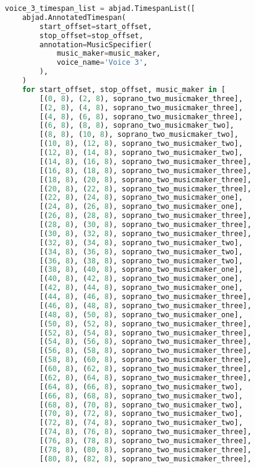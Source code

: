 \begin{lstlisting}[language=Python, caption=Invocation Source Code]
voice_3_timespan_list = abjad.TimespanList([
    abjad.AnnotatedTimespan(
        start_offset=start_offset,
        stop_offset=stop_offset,
        annotation=MusicSpecifier(
            music_maker=music_maker,
            voice_name='Voice 3',
        ),
    )
    for start_offset, stop_offset, music_maker in [
        [(0, 8), (2, 8), soprano_two_musicmaker_three],
        [(2, 8), (4, 8), soprano_two_musicmaker_three],
        [(4, 8), (6, 8), soprano_two_musicmaker_three],
        [(6, 8), (8, 8), soprano_two_musicmaker_two],
        [(8, 8), (10, 8), soprano_two_musicmaker_two],
        [(10, 8), (12, 8), soprano_two_musicmaker_two],
        [(12, 8), (14, 8), soprano_two_musicmaker_two],
        [(14, 8), (16, 8), soprano_two_musicmaker_three],
        [(16, 8), (18, 8), soprano_two_musicmaker_three],
        [(18, 8), (20, 8), soprano_two_musicmaker_three],
        [(20, 8), (22, 8), soprano_two_musicmaker_three],
        [(22, 8), (24, 8), soprano_two_musicmaker_one],
        [(24, 8), (26, 8), soprano_two_musicmaker_one],
        [(26, 8), (28, 8), soprano_two_musicmaker_three],
        [(28, 8), (30, 8), soprano_two_musicmaker_three],
        [(30, 8), (32, 8), soprano_two_musicmaker_three],
        [(32, 8), (34, 8), soprano_two_musicmaker_two],
        [(34, 8), (36, 8), soprano_two_musicmaker_two],
        [(36, 8), (38, 8), soprano_two_musicmaker_two],
        [(38, 8), (40, 8), soprano_two_musicmaker_one],
        [(40, 8), (42, 8), soprano_two_musicmaker_one],
        [(42, 8), (44, 8), soprano_two_musicmaker_one],
        [(44, 8), (46, 8), soprano_two_musicmaker_three],
        [(46, 8), (48, 8), soprano_two_musicmaker_three],
        [(48, 8), (50, 8), soprano_two_musicmaker_one],
        [(50, 8), (52, 8), soprano_two_musicmaker_three],
        [(52, 8), (54, 8), soprano_two_musicmaker_three],
        [(54, 8), (56, 8), soprano_two_musicmaker_three],
        [(56, 8), (58, 8), soprano_two_musicmaker_three],
        [(58, 8), (60, 8), soprano_two_musicmaker_three],
        [(60, 8), (62, 8), soprano_two_musicmaker_three],
        [(62, 8), (64, 8), soprano_two_musicmaker_three],
        [(64, 8), (66, 8), soprano_two_musicmaker_two],
        [(66, 8), (68, 8), soprano_two_musicmaker_two],
        [(68, 8), (70, 8), soprano_two_musicmaker_two],
        [(70, 8), (72, 8), soprano_two_musicmaker_two],
        [(72, 8), (74, 8), soprano_two_musicmaker_two],
        [(74, 8), (76, 8), soprano_two_musicmaker_three],
        [(76, 8), (78, 8), soprano_two_musicmaker_three],
        [(78, 8), (80, 8), soprano_two_musicmaker_three],
        [(80, 8), (82, 8), soprano_two_musicmaker_three],

\end{lstlisting}
